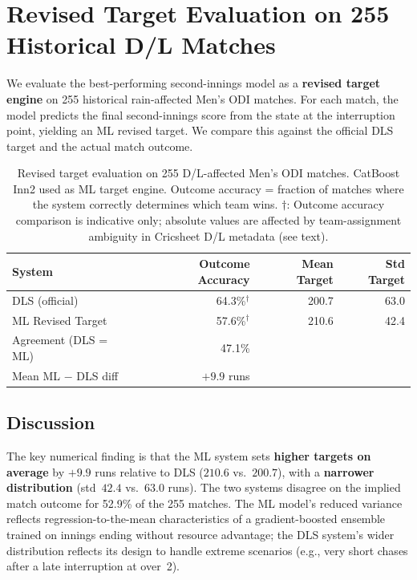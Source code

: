 \documentclass[12pt,a4paper,oneside]{report}
\begin{document}
\section{Revised Target Evaluation on 255 Historical D/L Matches}
\label{sec:revised_target_eval}

We evaluate the best-performing second-innings model as a \textbf{revised target engine} on 255 historical rain-affected Men's ODI matches.  For each match, the model predicts the final second-innings score from the state at the interruption point, yielding an ML revised target.  We compare this against the official DLS target and the actual match outcome.

\begin{table}[htbp]
\centering
\caption[Revised target evaluation on 255 D/L-affected matches]{Revised target evaluation on 255 D/L-affected Men's ODI matches.  CatBoost Inn2 used as ML target engine.  Outcome accuracy = fraction of matches where the system correctly determines which team wins.  $\dagger$: Outcome accuracy comparison is indicative only; absolute values are affected by team-assignment ambiguity in Cricsheet D/L metadata (see text).}
\label{tab:revised_targets}
\small
\begin{tabular}{lrrr}
\toprule
\textbf{System} & \textbf{Outcome Accuracy} & \textbf{Mean Target} & \textbf{Std Target} \\
\midrule
DLS (official)    & 64.3\%$^\dagger$ & 200.7 & 63.0 \\
ML Revised Target & 57.6\%$^\dagger$ & 210.6 & 42.4 \\
\midrule
Agreement (DLS = ML) & 47.1\% & & \\
Mean ML $-$ DLS diff & $+9.9$ runs & & \\
\bottomrule
\end{tabular}
\end{table}

\subsection{Discussion}

The key numerical finding is that the ML system sets \textbf{higher targets on average} by $+9.9$ runs relative to DLS ($210.6$ vs.\ $200.7$), with a \textbf{narrower distribution} (std~$42.4$ vs.\ $63.0$ runs).  The two systems disagree on the implied match outcome for 52.9\% of the 255 matches.  The ML model's reduced variance reflects regression-to-the-mean characteristics of a gradient-boosted ensemble trained on innings ending without resource advantage; the DLS system's wider distribution reflects its design to handle extreme scenarios (e.g., very short chases after a late interruption at over~2).
\end{document}
